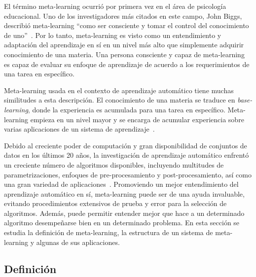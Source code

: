 
El término meta-learning ocurrió por primera vez en el área de psicología educacional. Uno de los investigadores más citados en este campo, John Biggs, describió meta-learning ``como ser consciente y tomar el control del conocimiento de uno''~\cite{biggs1985role}. Por lo tanto, meta-learning es visto como un entendimiento y adaptación del aprendizaje en sí en un nivel más alto que simplemente adquirir conocimiento de una materia. Una persona consciente y capaz de meta-learning es capaz de evaluar su enfoque de aprendizaje de acuerdo a los requerimientos de una tarea en específico.

Meta-learning usada en el contexto de aprendizaje automático tiene muchas similitudes a esta descripción. El conocimiento de una materia se traduce en \textit{base-learning}, donde la experiencia es acumulada para una tarea en específico. Meta-learning empieza en un nivel mayor y se encarga de acumular experiencia sobre varias aplicaciones de un sistema de aprendizaje~\cite{hospedales2021metalearning}.

Debido al creciente poder de computación y gran disponibilidad de conjuntos de datos en los últimos 20 años, la investigación de aprendizaje automático enfrentó un creciente número de algoritmos disponibles, incluyendo multitudes de parametrizaciones, enfoques de pre-procesamiento y post-procesamiento, así como una gran variedad de aplicaciones~\cite{lemke2013metalearning}. Promoviendo un mejor entendimiento del aprendizaje automático en sí, meta-learning puede ser de una ayuda invaluable, evitando procedimientos extensivos de prueba y error para la selección de algoritmos. Además, puede permitir entender mejor que hace a un determinado algoritmo desempeñarse bien en un determinado problema. En esta sección se estudia la definición de meta-learning, la estructura de un sistema de meta-learning y algunas de sus aplicaciones.

\subsection{Definición}\label{subsec:mtl-definition}

